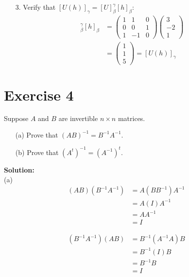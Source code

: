 \documentclass{article}
\begin{document}
\begin{enumerate}
\begin{enumerate}
\begin{enumerate}
\item[3.] Verify that $[U(h)]_{\gamma} = [U]_{\beta}^{\gamma}[h]_{\beta}$:
\begin{align*}
[U]_{\beta}^{\gamma}[h]_{\beta} &= 
\begin{pmatrix}
1 & 1 & 0 \\
0 & 0 & 1 \\
1 & -1 & 0
\end{pmatrix}
\begin{pmatrix}
3 \\
-2 \\
1
\end{pmatrix} \\
&= 
\begin{pmatrix}
1 \\
1 \\
5
\end{pmatrix} = [U(h)]_{\gamma}
\end{align*}
\end{enumerate}
\end{enumerate}
\end{enumerate}

\newpage

\section*{Exercise 4}
Suppose $A$ and $B$ are invertible $n \times n$ matrices.

\begin{enumerate}
\item[(a)] Prove that $(AB)^{-1} = B^{-1}A^{-1}$.
\item[(b)] Prove that $(A^t)^{-1} = (A^{-1})^t$.
\end{enumerate}

\textbf{Solution: } \\

(a)
\begin{align*}
(AB)(B^{-1}A^{-1}) &= A(BB^{-1})A^{-1} \\
&= A(I)A^{-1} \\
&= AA^{-1} \\
&= I
\end{align*}

\begin{align*}
(B^{-1}A^{-1})(AB) &= B^{-1}(A^{-1}A)B \\
&= B^{-1}(I)B \\
&= B^{-1}B \\
&= I
\end{align*}
\end{document}

